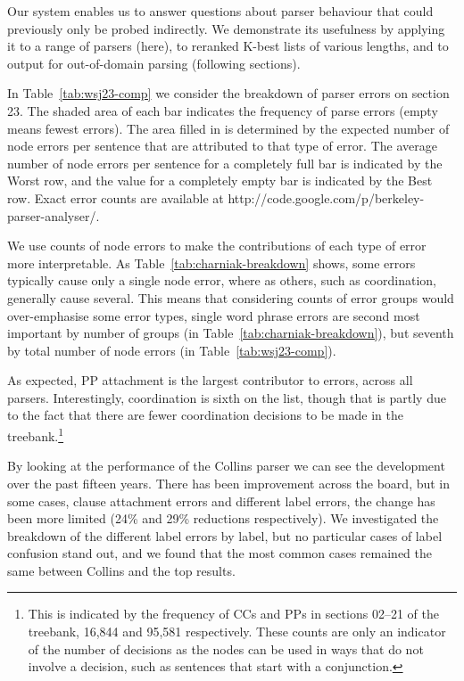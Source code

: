 Our system enables us to answer questions about parser behaviour that could
previously only be probed indirectly.  We demonstrate its usefulness by
applying it to a range of parsers (here), to reranked K-best lists of various
lengths, and to output for out-of-domain parsing (following sections).

In Table~\ref{tab:wsj23-comp} we consider the breakdown of parser errors on
\wsj section 23.  The shaded area of each bar indicates the frequency of parse
errors (\ie empty means fewest errors).  The area filled in is determined by
the expected number of node errors per sentence that are attributed to that
type of error.  The average number of node errors per sentence for a completely
full bar is indicated by the Worst row, and the value for a completely empty
bar is indicated by the Best row. Exact error counts are available at
http://code.google.com/p/berkeley-parser-analyser/.

We use counts of node errors to make the contributions of each type of error
more interpretable.  As Table~\ref{tab:charniak-breakdown} shows, some errors
typically cause only a single node error, where as others, such as
coordination, generally cause several.  This means that considering counts of
error groups would over-emphasise some error types, \eg single word phrase
errors are second most important by number of groups (in
Table~\ref{tab:charniak-breakdown}), but seventh by total number of node errors
(in Table~\ref{tab:wsj23-comp}).



As expected, PP attachment is the largest contributor to errors, across all
parsers.  Interestingly, coordination is sixth on the list, though that is
partly due to the fact that there are fewer coordination decisions to be made
in the treebank.\footnote{This is indicated by the frequency of CCs and PPs in
sections 02--21 of the treebank, 16,844 and 95,581 respectively.  These counts
are only an indicator of the number of decisions as the nodes can be used in
ways that do not involve a decision, such as sentences that start with a
conjunction.}

By looking at the performance of the Collins parser we can see the development
over the past fifteen years.  There has been improvement across
the board, but in some cases, \eg clause attachment errors and different label
errors, the change has been more limited (24\% and 29\% reductions respectively).  We
investigated the breakdown of the different label errors by label, but no
particular cases of label confusion stand out, and we found that the most
common cases remained the same between Collins and the top results.

